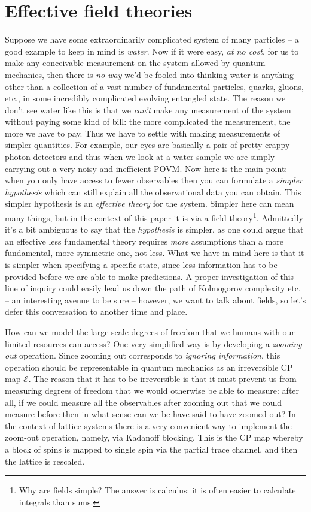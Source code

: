 \documentclass[11pt]{amsart}
\theoremstyle{plain}%
\theoremstyle{definition}
\theoremstyle{remark}
\begin{document}
\section{Effective field theories}\label{sec:effectivetheories}

Suppose we have some extraordinarily complicated system of many particles -- a good example to keep in mind is \emph{water}. Now if it were easy, \emph{at no cost}, for us to make any conceivable measurement on the system allowed by quantum mechanics, then there is \emph{no way} we'd be fooled into thinking water is anything other than a collection of a vast number of fundamental particles, quarks, gluons, etc., in some incredibly complicated evolving entangled state. The reason we don't see water like this is that we \emph{can't} make any measurement of the system without paying some kind of bill: the more complicated the measurement, the more we have to pay. Thus we have to settle with making measurements of simpler quantities. For example, our eyes are basically a pair of pretty crappy photon detectors and thus when we look at a water sample we are simply carrying out a very noisy and inefficient POVM. Now here is the main point: when you only have access to fewer observables then you can formulate a \emph{simpler hypothesis} which can still explain all the observational data you can obtain. This simpler hypothesis is an \emph{effective theory} for the system. Simpler here can mean many things, but in the context of this paper it is via a field theory\footnote{Why are fields simple? The answer is calculus: it is often easier to calculate integrals than sums.}. Admittedly it's a bit ambiguous to say that the \emph{hypothesis} is simpler, as one could argue that an effective less fundamental theory requires \emph{more} assumptions than a more fundamental, more symmetric one, not less. What we have in mind here is that it is simpler when specifying a specific state, since less information has to be provided before we are able to make predictions. A proper investigation of this line of inquiry could easily lead us down the path of Kolmogorov complexity etc. -- an interesting avenue to be sure -- however, we want to talk about fields, so let's defer this conversation to another time and place.

How can we model the large-scale degrees of freedom that we humans with our limited resources can access? One very simplified way is by developing a \emph{zooming out} operation. Since zooming out corresponds to \emph{ignoring information}, this operation should be representable in quantum mechanics as an irreversible CP map $\mathcal{E}$. The reason that it has to be irreversible is that it must prevent us from measuring degrees of freedom that we would otherwise be able to measure: after all, if we could measure all the observables after zooming out that we could measure before then in what sense can we be have said to have zoomed out? In the context of lattice systems there is a very convenient way to implement the zoom-out operation, namely, via Kadanoff blocking. This is the CP map whereby a block of spins is mapped to single spin via the partial trace channel, and then the lattice is rescaled.
\end{document}
